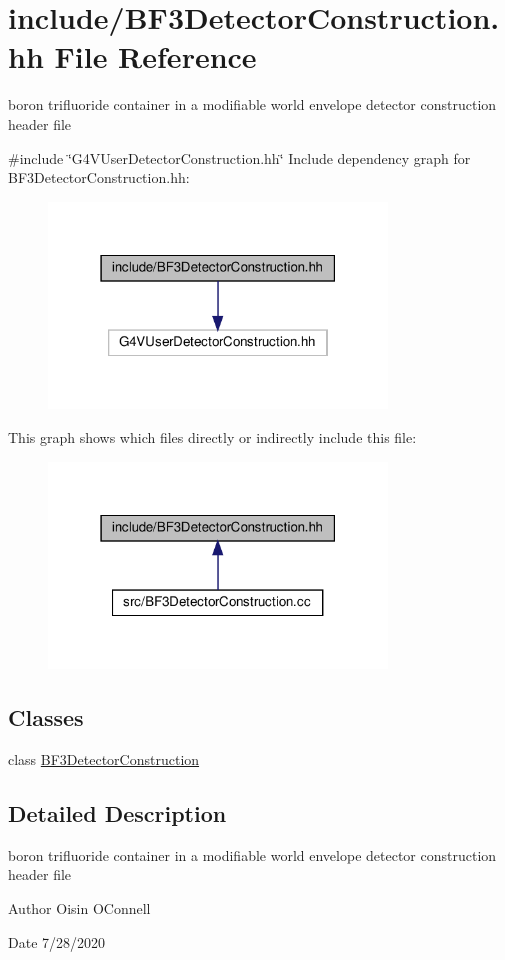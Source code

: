 \hypertarget{BF3DetectorConstruction_8hh}{}\section{include/\+B\+F3\+Detector\+Construction.hh File Reference}
\label{BF3DetectorConstruction_8hh}


boron trifluoride container in a modifiable world envelope detector construction header file  


{\ttfamily \#include \char`\"{}G4\+V\+User\+Detector\+Construction.\+hh\char`\"{}}\newline
Include dependency graph for B\+F3\+Detector\+Construction.\+hh\+:
\nopagebreak
\begin{figure}[H]
\begin{center}
\leavevmode
\includegraphics[width=255pt]{BF3DetectorConstruction_8hh__incl}
\end{center}
\end{figure}
This graph shows which files directly or indirectly include this file\+:
\nopagebreak
\begin{figure}[H]
\begin{center}
\leavevmode
\includegraphics[width=255pt]{BF3DetectorConstruction_8hh__dep__incl}
\end{center}
\end{figure}
\subsection*{Classes}
\begin{DoxyCompactItemize}
\item 
class \hyperlink{classBF3DetectorConstruction}{B\+F3\+Detector\+Construction}
\end{DoxyCompactItemize}


\subsection{Detailed Description}
boron trifluoride container in a modifiable world envelope detector construction header file 

\begin{DoxyAuthor}{Author}
Oisin O\textquotesingle{}Connell 
\end{DoxyAuthor}
\begin{DoxyDate}{Date}
7/28/2020 
\end{DoxyDate}
